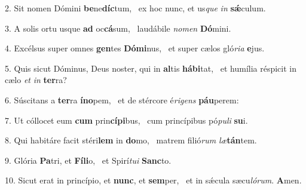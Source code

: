 2. Sit nomen Dómini \textbf{be}ne\textbf{díc}tum, \ast\  ex hoc nunc, et us\textit{que} \textit{in} \textbf{sǽ}culum.\

3. A solis ortu usque \textbf{ad} oc\textbf{cá}sum, \ast\  laudábile \textit{no}\textit{men} \textbf{Dó}mini.\

4. Excélsus super omnes \textbf{gen}tes \textbf{Dó}\textbf{mi}nus, \ast\  et super cælos gló\textit{ri}\textit{a} \textbf{e}jus.\

5. Quis sicut Dóminus, Deus noster, qui in \textbf{al}tis \textbf{há}\textbf{bi}tat, \ast\  et humília réspicit in cælo \textit{et} \textit{in} \textbf{ter}ra?\

6. Súscitans a \textbf{ter}ra \textbf{ín}\textbf{o}pem, \ast\  et de stércore é\textit{ri}\textit{gens} \textbf{páu}perem:\

7. Ut cóllocet eum \textbf{cum} prin\textbf{cí}\textbf{pi}bus, \ast\  cum princípibus pó\textit{pu}\textit{li} \textbf{su}i.\

8. Qui habitáre facit stéri\textbf{lem} in \textbf{do}mo, \ast\  matrem filió\textit{rum} \textit{læ}\textbf{tán}tem.\

9. Glória \textbf{Pa}tri, et \textbf{Fí}\textbf{li}o, \ast\  et Spirí\textit{tu}\textit{i} \textbf{Sanc}to.\

10. Sicut erat in princípio, et \textbf{nunc}, et \textbf{sem}per, \ast\  et in sǽcula sæcu\textit{ló}\textit{rum}. \textbf{A}men.\

